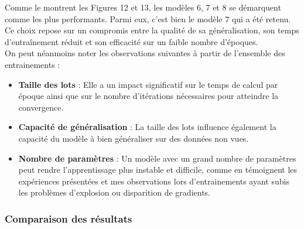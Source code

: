\begin{multicols}{2}
Comme le montrent les Figures 12 et 13, les modèles 6, 7 et 8 se démarquent comme 
les plus performants. Parmi eux, c'est bien le modèle 7 qui a été retenu. Ce choix repose sur un 
compromis entre la qualité de sa généralisation, son temps d’entraînement réduit et 
son efficacité sur un faible nombre d’époques. \\

On peut néanmoins noter les observations suivantes à partir de l'ensemble des entrainements :  
\begin{itemize}
    \item \textbf{Taille des lots} : Elle a un impact significatif sur le temps de calcul par époque ainsi que sur le nombre d’itérations nécessaires pour atteindre la convergence.  
    \item \textbf{Capacité de généralisation} : La taille des lots influence également la capacité du modèle à bien généraliser sur des données non vues.  
    \item \textbf{Nombre de paramètres} : Un modèle avec un grand nombre de paramètres peut rendre l’apprentissage plus instable et difficile, comme en témoignent les expériences présentées et mes observations lors 
    d'entrainements ayant subis les problèmes d'explosion ou disparition de gradients.
\end{itemize}
\hfill\break


\subsubsection{Comparaison des résultats}

\end{multicols}